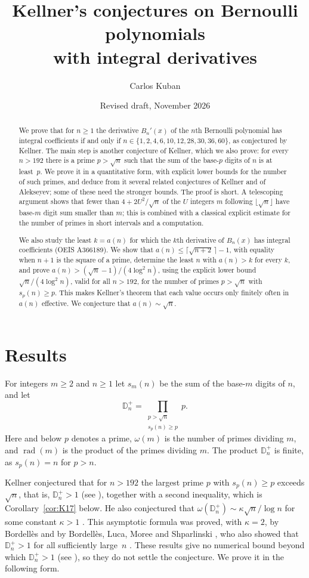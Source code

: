 \documentclass[11pt]{amsart}
\title[Bernoulli polynomials with integral derivatives]{Kellner's conjectures on Bernoulli polynomials\\ with integral derivatives}
\author{Carlos Kuban}
\date{Revised draft, November 2026}
\theoremstyle{remark}
\numberwithin{equation}{section}
\newcommand{\Dp}{\mathbb D^{+}}
\newcommand{\fl}[1]{\lfloor #1\rfloor}
\begin{document}
\begin{abstract}
We prove that for $n\ge1$ the derivative $B_n'(x)$ of the $n$th Bernoulli polynomial has integral coefficients if and only if
$n\in\{1,2,4,6,10,12,28,30,36,60\}$, as conjectured by Kellner. The main step is another conjecture of Kellner, which we also prove:
for every $n>192$ there is a prime $p>\sqrt n$ such that the sum of the base-$p$ digits of $n$ is at least~$p$.
We prove it in a quantitative form, with explicit lower bounds for the number of such primes, and deduce from it several related
conjectures of Kellner and of Alekseyev; some of these need the stronger bounds.
The proof is short. A telescoping argument shows that fewer than $4+2U^2/\sqrt n$ of the $U$ integers $m$ following $\fl{\sqrt n}$
have base-$m$ digit sum smaller than $m$; this is combined with a classical explicit estimate for the number of primes in short intervals
and a computation.

We also study the least $k=a(n)$ for which the $k$th derivative of $B_n(x)$ has integral coefficients (OEIS A366189). We show that
$a(n)\le\lceil\sqrt{n+2}\,\rceil-1$, with equality when $n+1$ is the square of a prime, determine the least $n$ with $a(n)>k$ for every
$k$, and prove $a(n)>(\sqrt n-1)/(4\log^2n)$, using the explicit lower bound $\sqrt n/(4\log^2n)$, valid for all $n>192$, for the
number of primes $p>\sqrt n$ with $s_p(n)\ge p$. This makes Kellner's theorem that each value occurs only finitely often in $a(n)$
effective. We conjecture that $a(n)\sim\sqrt n$.
\end{abstract}
\maketitle

\section{Results}

For integers $m\ge2$ and $n\ge1$ let $s_m(n)$ be the sum of the base-$m$ digits of $n$, and let
\[
\Dp_n=\prod_{\substack{p>\sqrt n\\ s_p(n)\ge p}}p .
\]
Here and below $p$ denotes a prime, $\omega(m)$ is the number of primes dividing $m$, and $\operatorname{rad}(m)$ is the product of the
primes dividing $m$. The product $\Dp_n$ is finite, as $s_p(n)=n$ for $p>n$.

Kellner \cite[Conjecture 1]{K17} conjectured that for $n>192$ the largest prime $p$ with $s_p(n)\ge p$ exceeds $\sqrt n$, that is,
$\Dp_n>1$ (see \cite[Conjecture 2(i)]{K24}), together with a second inequality, which is Corollary~\ref{cor:K17} below.
He also conjectured that $\omega(\Dp_n)\sim\kappa\sqrt n/\log n$ for some constant $\kappa>1$ \cite[Conjecture 2]{K17}.
This asymptotic formula was proved, with $\kappa=2$, by Bordell\`es \cite[Theorem 1 and Corollary 2]{B17} and by Bordell\`es,
Luca, Moree and Shparlinski \cite[Theorem 1.5 and Corollary 1.6]{BLMS}, who also showed that $\Dp_n>1$ for all sufficiently large~$n$
\cite[Theorem 1.4]{BLMS}. These results give no numerical bound beyond which $\Dp_n>1$ (see \cite[p.~3]{K24}), so they do not settle
the conjecture. We prove it in the following form.
\end{document}
